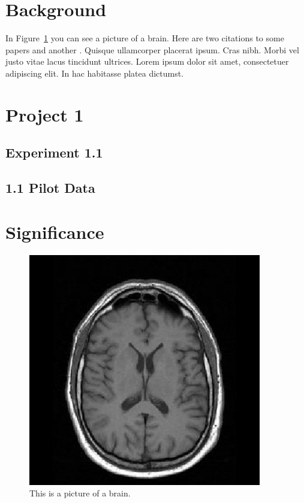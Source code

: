 \documentclass[12pt,letterpaper]{article}
\begin{document}
\section*{Background}

In Figure~\ref{fig:brain} you can see a picture of a brain. Here are two citations to some papers \cite{HODGKIN:1952aa,HODGKIN:1952ab,Hodgkin:1947aa} and another \cite{Hodgkin:1990aa}. Quisque ullamcorper placerat ipsum. Cras nibh. Morbi vel justo vitae lacus tincidunt ultrices. Lorem ipsum dolor sit amet, consectetuer adipiscing elit. In hac habitasse platea dictumst.

\lipsum[1-9]


\section*{Project 1}

\lipsum[1-2]

\subsection*{Experiment 1.1}

\lipsum[1-5]

\subsection*{1.1 Pilot Data}

\lipsum[1-2]


\section*{Significance}

\lipsum[1-2]

\newpage
\onecolumn



\newpage
\clearpage
\begin{figure}[H]
  \centering
  \includegraphics[width=4in]{figures/t1_brain.jpg}
  \caption{This is a picture of a brain.}
  \label{fig:brain}
\end{figure}
\end{document}
